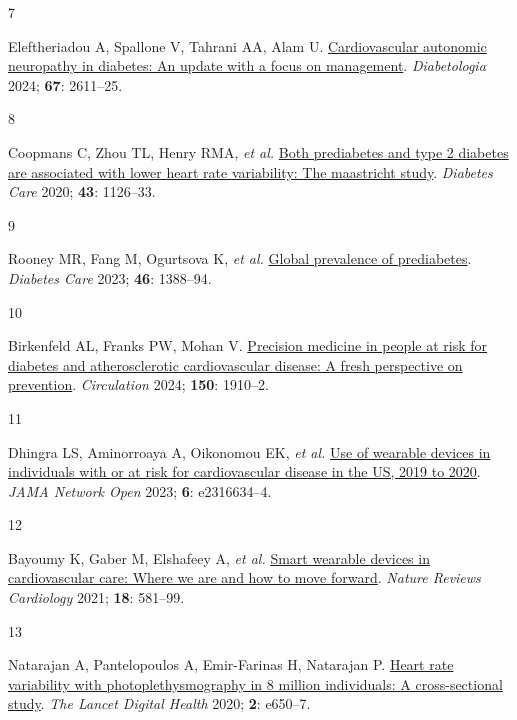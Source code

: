 \documentclass[
  a4paper,
  headsepline=true,
  open=any]{scrbook}
\newlength{\cslhangindent}
\newlength{\csllabelwidth}
\newlength{\cslentryspacingunit} %
\newenvironment{CSLReferences}[2] %
 {%
  \setlength{\parindent}{0pt}
  \ifodd #1
  \let\oldpar\par
  \def\par{\hangindent=\cslhangindent\oldpar}
  \fi
  \setlength{\parskip}{#2\cslentryspacingunit}
 }%
 {}
\newcommand{\CSLLeftMargin}[1]{\parbox[t]{\csllabelwidth}{#1}}
\newcommand{\CSLRightInline}[1]{\parbox[t]{\linewidth - \csllabelwidth}{#1}\break}
\begin{document}
\begin{CSLReferences}{0}{0}
\leavevmode{}%
\CSLLeftMargin{7 }%
\CSLRightInline{Eleftheriadou A, Spallone V, Tahrani AA, Alam U.
\href{https://doi.org/10.1007/s00125-024-06242-0}{Cardiovascular
autonomic neuropathy in diabetes: An update with a focus on management}.
\emph{Diabetologia} 2024; \textbf{67}: 2611--25.}

\leavevmode{}%
\CSLLeftMargin{8 }%
\CSLRightInline{Coopmans C, Zhou TL, Henry RMA, \emph{et al.}
\href{https://doi.org/10.2337/dc19-2367}{Both prediabetes and type 2
diabetes are associated with lower heart rate variability: The
maastricht study}. \emph{Diabetes Care} 2020; \textbf{43}: 1126--33.}

\leavevmode{}%
\CSLLeftMargin{9 }%
\CSLRightInline{Rooney MR, Fang M, Ogurtsova K, \emph{et al.}
\href{https://doi.org/10.2337/dc22-2376}{Global prevalence of
prediabetes}. \emph{Diabetes Care} 2023; \textbf{46}: 1388--94.}

\leavevmode{}%
\CSLLeftMargin{10 }%
\CSLRightInline{Birkenfeld AL, Franks PW, Mohan V.
\href{https://doi.org/10.1161/CIRCULATIONAHA.124.070463}{Precision
medicine in people at risk for diabetes and atherosclerotic
cardiovascular disease: A fresh perspective on prevention}.
\emph{Circulation} 2024; \textbf{150}: 1910--2.}

\leavevmode{}%
\CSLLeftMargin{11 }%
\CSLRightInline{Dhingra LS, Aminorroaya A, Oikonomou EK, \emph{et al.}
\href{https://doi.org/10.1001/jamanetworkopen.2023.16634}{Use of
wearable devices in individuals with or at risk for cardiovascular
disease in the US, 2019 to 2020}. \emph{JAMA Network Open} 2023;
\textbf{6}: e2316634--4.}

\leavevmode{}%
\CSLLeftMargin{12 }%
\CSLRightInline{Bayoumy K, Gaber M, Elshafeey A, \emph{et al.}
\href{https://doi.org/10.1038/s41569-021-00522-7}{Smart wearable devices
in cardiovascular care: Where we are and how to move forward}.
\emph{Nature Reviews Cardiology} 2021; \textbf{18}: 581--99.}

\leavevmode{}%
\CSLLeftMargin{13 }%
\CSLRightInline{Natarajan A, Pantelopoulos A, Emir-Farinas H, Natarajan
P. \href{https://doi.org/10.1016/S2589-7500(20)30246-6}{Heart rate
variability with photoplethysmography in 8 million individuals: A
cross-sectional study}. \emph{The Lancet Digital Health} 2020;
\textbf{2}: e650--7.}


\end{CSLReferences}
\end{document}
